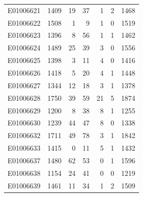 \documentclass[
  letterpaper,
  DIV=11,
  numbers=noendperiod]{scrreprt}
\begin{document}
\begin{tabular}{lrrrrrr}
E01006621     &    1409 &      19 &                    37 &                               1 &                       2 &              1468 \\
E01006622     &    1508 &       1 &                     9 &                               1 &                       0 &              1519 \\
E01006623     &    1396 &       8 &                    56 &                               1 &                       1 &              1462 \\
E01006624     &    1489 &      25 &                    39 &                               3 &                       0 &              1556 \\
E01006625     &    1398 &       3 &                    11 &                               4 &                       0 &              1416 \\
E01006626     &    1418 &       5 &                    20 &                               4 &                       1 &              1448 \\
E01006627     &    1344 &      12 &                    18 &                               3 &                       1 &              1378 \\
E01006628     &    1750 &      39 &                    59 &                              21 &                       5 &              1874 \\
E01006629     &    1200 &       8 &                    38 &                               8 &                       1 &              1255 \\
E01006630     &    1239 &      44 &                    47 &                               8 &                       0 &              1338 \\
E01006632     &    1711 &      49 &                    78 &                               3 &                       1 &              1842 \\
E01006633     &    1415 &       0 &                    11 &                               5 &                       1 &              1432 \\
E01006637     &    1480 &      62 &                    53 &                               0 &                       1 &              1596 \\
E01006638     &    1154 &      24 &                    41 &                               0 &                       0 &              1219 \\
E01006639     &    1461 &      11 &                    34 &                               1 &                       2 &              1509 \\

\end{tabular}
\end{document}
